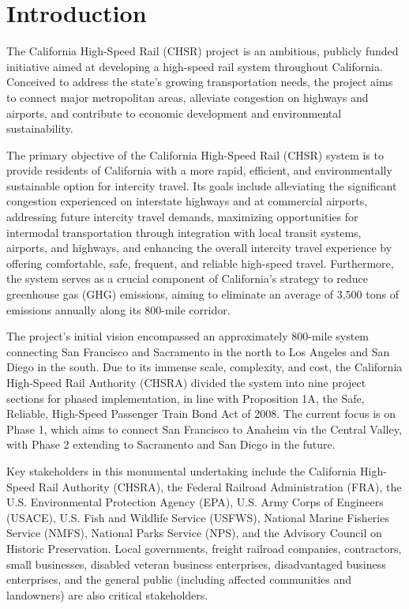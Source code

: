 \titlespacing*{\chapter}{0pt}{0pt}{0pt}

\chapter{Introduction}

The California High-Speed Rail (CHSR) project is an ambitious, publicly funded initiative aimed at developing a high-speed rail system throughout California. Conceived to address the state's growing transportation needs, the project aims to connect major metropolitan areas, alleviate congestion on highways and airports, and contribute to economic development and environmental sustainability.

The primary objective of the California High-Speed Rail (CHSR) system is to provide residents of California with a more rapid, efficient, and environmentally sustainable option for intercity travel. Its goals include alleviating the significant congestion experienced on interstate highways and at commercial airports, addressing future intercity travel demands, maximizing opportunities for intermodal transportation through integration with local transit systems, airports, and highways, and enhancing the overall intercity travel experience by offering comfortable, safe, frequent, and reliable high-speed travel. Furthermore, the system serves as a crucial component of California's strategy to reduce greenhouse gas (GHG) emissions, aiming to eliminate an average of 3,500 tons of emissions annually along its 800-mile corridor.

The project's initial vision encompassed an approximately 800-mile system connecting San Francisco and Sacramento in the north to Los Angeles and San Diego in the south. Due to its immense scale, complexity, and cost, the California High-Speed Rail Authority (CHSRA) divided the system into nine project sections for phased implementation, in line with Proposition 1A, the Safe, Reliable, High-Speed Passenger Train Bond Act of 2008. The current focus is on Phase 1, which aims to connect San Francisco to Anaheim via the Central Valley, with Phase 2 extending to Sacramento and San Diego in the future.

Key stakeholders in this monumental undertaking include the California High-Speed Rail Authority (CHSRA), the Federal Railroad Administration (FRA), the U.S. Environmental Protection Agency (EPA), U.S. Army Corps of Engineers (USACE), U.S. Fish and Wildlife Service (USFWS), National Marine Fisheries Service (NMFS), National Parks Service (NPS), and the Advisory Council on Historic Preservation. Local governments, freight railroad companies, contractors, small businesses, disabled veteran business enterprises, disadvantaged business enterprises, and the general public (including affected communities and landowners) are also critical stakeholders.

